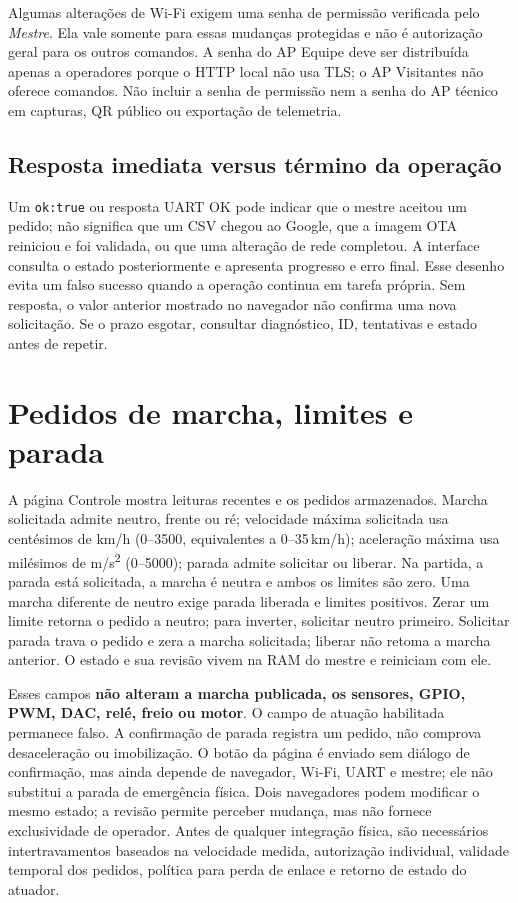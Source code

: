 Algumas alterações de Wi-Fi exigem uma senha de permissão verificada pelo \emph{Mestre}. Ela vale somente para essas mudanças protegidas e não é autorização geral para os outros comandos. A senha do AP Equipe deve ser distribuída apenas a operadores porque o HTTP local não usa TLS; o AP Visitantes não oferece comandos. Não incluir a senha de permissão nem a senha do AP técnico em capturas, QR público ou exportação de telemetria.

\subsection{Resposta imediata versus término da operação}
Um \texttt{ok:true} ou resposta UART OK pode indicar que o mestre aceitou um pedido; não significa que um CSV chegou ao Google, que a imagem OTA reiniciou e foi validada, ou que uma alteração de rede completou. A interface consulta o estado posteriormente e apresenta progresso e erro final. Esse desenho evita um falso sucesso quando a operação continua em tarefa própria. Sem resposta, o valor anterior mostrado no navegador não confirma uma nova solicitação. Se o prazo esgotar, consultar diagnóstico, ID, tentativas e estado antes de repetir.

\section{Pedidos de marcha, limites e parada}
A página Controle mostra leituras recentes e os pedidos armazenados. Marcha solicitada admite neutro, frente ou ré; velocidade máxima solicitada usa centésimos de km/h (0--3500, equivalentes a 0--35\,km/h); aceleração máxima usa milésimos de m/s\textsuperscript{2} (0--5000); parada admite solicitar ou liberar. Na partida, a parada está solicitada, a marcha é neutra e ambos os limites são zero. Uma marcha diferente de neutro exige parada liberada e limites positivos. Zerar um limite retorna o pedido a neutro; para inverter, solicitar neutro primeiro. Solicitar parada trava o pedido e zera a marcha solicitada; liberar não retoma a marcha anterior. O estado e sua revisão vivem na RAM do mestre e reiniciam com ele.

Esses campos \textbf{não alteram a marcha publicada, os sensores, GPIO, PWM, DAC, relé, freio ou motor}. O campo de atuação habilitada permanece falso. A confirmação de parada registra um pedido, não comprova desaceleração ou imobilização. O botão da página é enviado sem diálogo de confirmação, mas ainda depende de navegador, Wi-Fi, UART e mestre; ele não substitui a parada de emergência física. Dois navegadores podem modificar o mesmo estado; a revisão permite perceber mudança, mas não fornece exclusividade de operador. Antes de qualquer integração física, são necessários intertravamentos baseados na velocidade medida, autorização individual, validade temporal dos pedidos, política para perda de enlace e retorno de estado do atuador.

